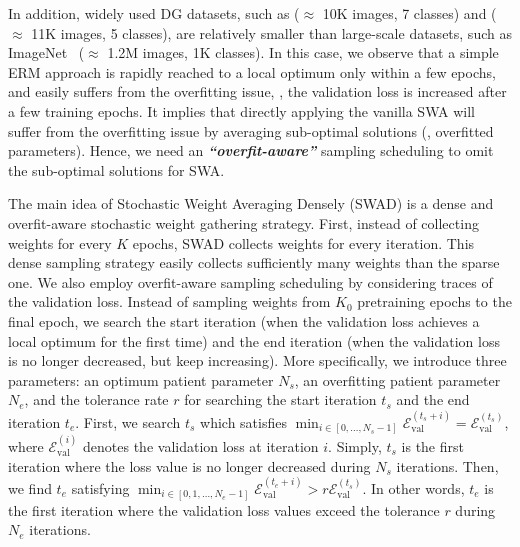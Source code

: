 In addition, widely used DG datasets, such as  ($\approx$ 10K images, 7 classes) and  ($\approx$ 11K images, 5 classes), are relatively smaller than large-scale datasets, such as ImageNet~\cite{russakovsky2015imagenet} ($\approx$ 1.2M images, 1K classes). In this case, we observe that a simple ERM approach is rapidly reached to a local optimum only within a few epochs, and easily suffers from the overfitting issue, \ie, the validation loss is increased after a few training epochs.
It implies that directly applying the vanilla SWA will suffer from the overfitting issue by averaging sub-optimal solutions (\ie, overfitted parameters).
Hence, we need an \textbf{\textit{``overfit-aware''}} sampling scheduling to omit the sub-optimal solutions for SWA.

The main idea of Stochastic Weight Averaging Densely (SWAD) is a dense and overfit-aware stochastic weight gathering strategy.
First, instead of collecting weights for every $K$ epochs, SWAD collects weights for every iteration. This dense sampling strategy easily collects sufficiently many weights than the sparse one.
We also employ overfit-aware sampling scheduling by considering traces of the validation loss.
Instead of sampling weights from $K_0$ pretraining epochs to the final epoch, we search the start iteration (when the validation loss achieves a local optimum for the first time) and the end iteration (when the validation loss is no longer decreased, but keep increasing).
More specifically, we introduce three parameters: an optimum patient parameter $N_s$, an overfitting patient parameter $N_e$, and the tolerance rate $r$ for searching the start iteration $t_s$ and the end iteration $t_e$.
First, we search $t_s$ which satisfies $\min_{i\in[0, \ldots, N_s-1]} \mathcal E_\text{val}^{(t_s + i)}=\mathcal E_\text{val}^{(t_s)}$, where $\mathcal{E}_\text{val}^{(i)}$ denotes the validation loss at iteration $i$.
Simply, $t_s$ is the first iteration where the loss value is no longer decreased during $N_s$ iterations.
Then, we find $t_e$ satisfying $\min_{i \in [0, 1, \ldots, N_e - 1]} \mathcal E_\text{val}^{(t_e + i)} > r \mathcal E_\text{val}^{(t_s)}$.
In other words, $t_e$ is the first iteration where the validation loss values exceed the tolerance $r$ during $N_e$ iterations.


